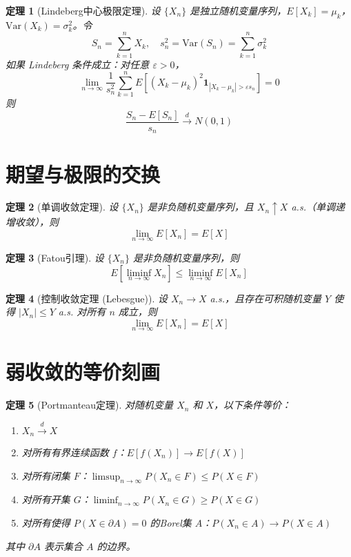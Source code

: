 \documentclass[12pt]{article}
\newtheorem{theorem}{定理}
\begin{document}
\begin{theorem}[Lindeberg中心极限定理]
设 $\{X_n\}$ 是独立随机变量序列，$E[X_k] = \mu_k$，$\text{Var}(X_k) = \sigma_k^2$。令
$$S_n = \sum_{k=1}^n X_k, \quad s_n^2 = \text{Var}(S_n) = \sum_{k=1}^n \sigma_k^2$$
如果 Lindeberg 条件成立：对任意 $\varepsilon > 0$，
$$\lim_{n \to \infty} \frac{1}{s_n^2} \sum_{k=1}^n E[(X_k - \mu_k)^2 \mathbf{1}_{|X_k - \mu_k| > \varepsilon s_n}] = 0$$
则
$$\frac{S_n - E[S_n]}{s_n} \xrightarrow{d} N(0,1)$$
\end{theorem}

\section{期望与极限的交换}

\begin{theorem}[单调收敛定理]
设 $\{X_n\}$ 是非负随机变量序列，且 $X_n \uparrow X$ a.s.（单调递增收敛），则
$$\lim_{n \to \infty} E[X_n] = E[X]$$
\end{theorem}

\begin{theorem}[Fatou引理]
设 $\{X_n\}$ 是非负随机变量序列，则
$$E[\liminf_{n \to \infty} X_n] \leq \liminf_{n \to \infty} E[X_n]$$
\end{theorem}

\begin{theorem}[控制收敛定理 (Lebesgue)]
设 $X_n \to X$ a.s.，且存在可积随机变量 $Y$ 使得 $|X_n| \leq Y$ a.s. 对所有 $n$ 成立，则
$$\lim_{n \to \infty} E[X_n] = E[X]$$
\end{theorem}

\section{弱收敛的等价刻画}

\begin{theorem}[Portmanteau定理]
对随机变量 $X_n$ 和 $X$，以下条件等价：
\begin{enumerate}
\item $X_n \xrightarrow{d} X$
\item 对所有有界连续函数 $f$：$E[f(X_n)] \to E[f(X)]$
\item 对所有闭集 $F$：$\limsup_{n \to \infty} P(X_n \in F) \leq P(X \in F)$
\item 对所有开集 $G$：$\liminf_{n \to \infty} P(X_n \in G) \geq P(X \in G)$
\item 对所有使得 $P(X \in \partial A) = 0$ 的Borel集 $A$：$P(X_n \in A) \to P(X \in A)$
\end{enumerate}
其中 $\partial A$ 表示集合 $A$ 的边界。
\end{theorem}
\end{document}
